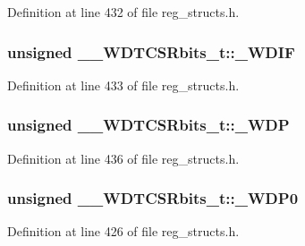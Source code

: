 Definition at line 432 of file reg\+\_\+structs.\+h.

\hypertarget{union_____w_d_t_c_s_rbits__t_a96306a462627b2393e8b3527461b47c7}{
\subsubsection[{\+\_\+\+W\+D\+I\+F}]{\setlength{\rightskip}{0pt plus 5cm}unsigned \+\_\+\+\_\+\+W\+D\+T\+C\+S\+Rbits\+\_\+t\+::\+\_\+\+W\+D\+I\+F}}\label{union_____w_d_t_c_s_rbits__t_a96306a462627b2393e8b3527461b47c7}


Definition at line 433 of file reg\+\_\+structs.\+h.

\hypertarget{union_____w_d_t_c_s_rbits__t_a3d6145dfa2d7d823843f37d37ac54767}{
\subsubsection[{\+\_\+\+W\+D\+P}]{\setlength{\rightskip}{0pt plus 5cm}unsigned \+\_\+\+\_\+\+W\+D\+T\+C\+S\+Rbits\+\_\+t\+::\+\_\+\+W\+D\+P}}\label{union_____w_d_t_c_s_rbits__t_a3d6145dfa2d7d823843f37d37ac54767}


Definition at line 436 of file reg\+\_\+structs.\+h.

\hypertarget{union_____w_d_t_c_s_rbits__t_aecebde38eea725dc01757e9ed2e828db}{
\subsubsection[{\+\_\+\+W\+D\+P0}]{\setlength{\rightskip}{0pt plus 5cm}unsigned \+\_\+\+\_\+\+W\+D\+T\+C\+S\+Rbits\+\_\+t\+::\+\_\+\+W\+D\+P0}}\label{union_____w_d_t_c_s_rbits__t_aecebde38eea725dc01757e9ed2e828db}


Definition at line 426 of file reg\+\_\+structs.\+h.

